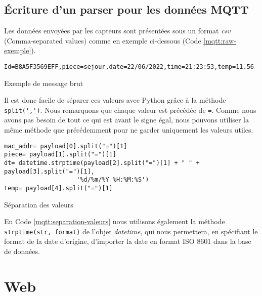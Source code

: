 \documentclass{article}
\begin{document}
    \subsection{Écriture d'un parser pour les données MQTT}
    Les données envoyées par les capteurs sont présentées sous un format \emph{csv} (Comma-separated values) comme en exemple ci-dessous (Code \ref{mqtt:raw-exemple}). 
    \begin{listing}[H]
        \begin{verbatim}
Id=B8A5F3569EFF,piece=sejour,date=22/06/2022,time=21:23:53,temp=11.56
        \end{verbatim}
        \caption{Exemple de message brut}
        \label{mqtt:raw-exemple}
    \end{listing}
    Il est donc facile de séparer ces valeurs avec Python grâce à la méthode \verb|split(',')|. Nous remarquons que chaque valeur est précédée de \verb|=|. 
    Comme nous avons pas besoin de tout ce qui est avant le signe égal, nous pouvons utiliser la même méthode que précédemment pour ne garder uniquement les valeurs utiles.

    \begin{listing}[H]
        \begin{verbatim}
mac_addr= payload[0].split("=")[1]
piece= payload[1].split("=")[1]
dt= datetime.strptime(payload[2].split("=")[1] + " " + payload[3].split("=")[1],
                    '%d/%m/%Y %H:%M:%S')
temp= payload[4].split("=")[1]
        \end{verbatim}
        \caption{Séparation des valeurs}
        \label{mqtt:separation-valeurs}
    \end{listing}
    En Code \ref{mqtt:separation-valeurs} nous utilisons également la méthode \verb|strptime(str, format)| de l'objet \emph{datetime}, qui nous permettera, en spécifiant le format de la date d'origine, d'importer la date en format ISO 8601 dans la base de données.  
\newpage
\section{Web}
\end{document}
